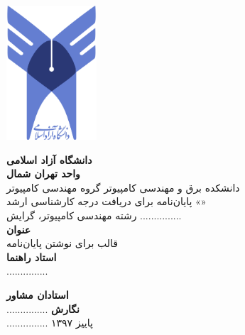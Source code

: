 \thispagestyle{empty}

\centerline{\includegraphics[height=5cm]{figs/logo.png}}

\begin{center}
\vspace{0.5cm}

\textbf{دانشگاه آزاد اسلامی}
\\[.2cm]
\textbf{واحد تهران شمال}
\\[0.5cm]

دانشکده برق و مهندسی کامپیوتر گروه مهندسی کامپیوتر
\\[.5cm]
پایان‌نامه برای دریافت درجه کارشناسی ارشد «»
\\[.2cm]
رشته مهندسی کامپیوتر، گرایش ...............
\\[0.5cm]

{\Large
\textbf{عنوان}
}
\\
قالب  برای نوشتن پایان‌نامه
\\[0.5cm]

{\Large
	\textbf{استاد راهنما}
}
\\
...............
\vskip 0.5cm

{\Large
	\textbf{استادان مشاور}
}
\\
...............
\vskip 0.5cm
{\Large
	\textbf{نگارش}
}
\\
...............
\vskip 0.5cm
پاییز ۱۳۹۷
\end{center}